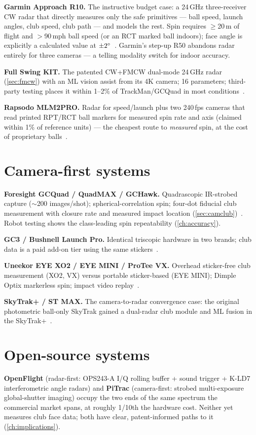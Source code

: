 \textbf{Garmin Approach R10.} The instructive budget case: a 24\,GHz
three-receiver CW radar that directly measures only the safe primitives
--- ball speed, launch angles, club speed, club path --- and models the
rest. Spin requires $\ge$20\,m of flight and $>$90\,mph ball speed (or an
RCT marked ball indoors); face angle is explicitly a calculated value at
$\pm2\si{\degree}$~\cite{garminr10accuracy,garminr10data}. Garmin's step-up
R50 abandons radar entirely for three cameras --- a telling modality
switch for indoor accuracy.

\textbf{Full Swing KIT.} The patented CW+FMCW dual-mode 24\,GHz radar
(\cref{sec:fmcw}) with an ML vision assist from its 4K camera; 16
parameters; third-party testing places it within 1--2\% of
TrackMan/GCQuad in most conditions~\cite{fullswingkit}.

\textbf{Rapsodo MLM2PRO.} Radar for speed/launch plus two 240\,fps
cameras that read printed RPT/RCT ball markers for measured spin rate and
axis (claimed within 1\% of reference units) --- the cheapest route to
\emph{measured} spin, at the cost of proprietary
balls~\cite{mygolfspymlm2pro}.

\section{Camera-first systems}

\textbf{Foresight GCQuad / QuadMAX / GCHawk.} Quadrascopic IR-strobed
capture ($\sim$200 images/shot); spherical-correlation spin; four-dot
fiducial club measurement with closure rate and measured impact location
(\cref{sec:camclub})~\cite{foresightgcquad,foresighthmt}. Robot testing
shows the class-leading spin repeatability
(\cref{ch:accuracy}).

\textbf{GC3 / Bushnell Launch Pro.} Identical triscopic hardware in two
brands; club data is a paid add-on tier using the same
stickers~\cite{playbetterblp}.

\textbf{Uneekor EYE XO2 / EYE MINI / ProTee VX.} Overhead sticker-free
club measurement (XO2, VX) versus portable sticker-based (EYE MINI);
Dimple Optix markerless spin; impact video replay~\cite{uneekoreyexo,
proteevx}.

\textbf{SkyTrak+ / ST MAX.} The camera-to-radar convergence case: the
original photometric ball-only SkyTrak gained a dual-radar club module and
ML fusion in the SkyTrak+~\cite{skytrakplus}.

\section{Open-source systems}

\textbf{OpenFlight} (radar-first: OPS243-A I/Q rolling buffer + sound
trigger + K-LD7 interferometric angle radars) and \textbf{PiTrac}
(camera-first: strobed multi-exposure global-shutter imaging) occupy the
two ends of the same spectrum the commercial market spans, at roughly
1/10th the hardware cost. Neither yet measures club face data; both have
clear, patent-informed paths to it (\cref{ch:implications}).
